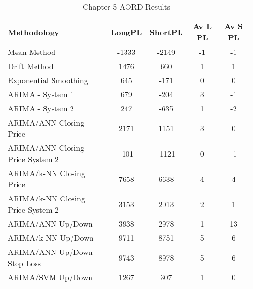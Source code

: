 \begin{table}[ht]
\centering
\caption[Chapter 5 AORD Results]{Chapter 5 AORD Results} 
\label{tab:chp6:aord2_summary}
\begin{tabular}{lcccc}
  \toprule Methodology & LongPL & ShortPL & Av L PL & Av S PL \\ 
  \midrule Mean Method & -1333 & -2149 & -1 & -1 \\ 
  Drift Method & 1476 & 660 & 1 & 1 \\ 
  Exponential Smoothing & 645 & -171 & 0 & 0 \\ 
  ARIMA - System 1 & 679 & -204 & 3 & -1 \\ 
  ARIMA - System 2 & 247 & -635 & 1 & -2 \\ 
  ARIMA/ANN Closing Price & 2171 & 1151 & 3 & 0 \\ 
  ARIMA/ANN Closing Price System 2 & -101 & -1121 & 0 & -1 \\ 
  ARIMA/k-NN Closing Price & 7658 & 6638 & 4 & 4 \\ 
  ARIMA/k-NN Closing Price System 2 & 3153 & 2013 & 2 & 1 \\ 
  ARIMA/ANN Up/Down & 3938 & 2978 & 1 & 13 \\ 
  ARIMA/k-NN Up/Down & 9711 & 8751 & 5 & 6 \\ 
  ARIMA/ANN Up/Down Stop Loss & 9743 & 8978 & 5 & 6 \\ 
  ARIMA/SVM Up/Down & 1267 & 307 & 1 & 0 \\ 
   \bottomrule \end{tabular}
\end{table}
